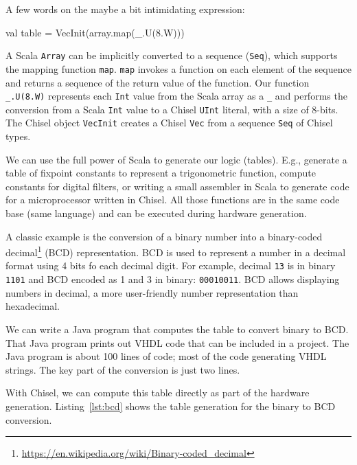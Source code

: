 \documentclass[%
    10pt,
    headinclude, footexclude,
    openright, %
    notitlepage,
    cleardoubleempty,
    headsepline,
    pointlessnumbers,
    bibtotoc, idxtotoc,
    ]{scrbook}
\newcommand{\code}[1]{{\small{\texttt{#1}}}}
\newcommand{\myref}[2]{\href{#1}{#2}}
\renewcommand{\myref}[2]{{#2}{\footnote{\url{#1}}}}
\begin{document}
A few words on the maybe a bit intimidating expression:
\begin{chisel}
  val table = VecInit(array.map(_.U(8.W)))
\end{chisel}

\noindent A Scala \code{Array} can be implicitly converted to a sequence (\code{Seq}),
which supports the mapping function \code{map}.
\code{map} invokes a function on each element of the sequence and returns
a sequence of the return value of the function. Our function \code{\_.U(8.W)} represents
each \code{Int} value from the Scala array as a \code{\_} and performs the conversion
from a Scala \code{Int} value to a Chisel \code{UInt} literal, with a size of 8-bits.
The Chisel object \code{VecInit} creates a Chisel \code{Vec} from a sequence \code{Seq}
of Chisel types.



We can use the full power of Scala to generate our logic (tables).
E.g., generate a table of fixpoint constants to represent a trigonometric function,
compute constants for digital filters, or writing a small assembler in Scala
to generate code for a microprocessor written in Chisel. All those functions
are in the same code base (same language) and can be executed during
hardware generation.

A classic example is the conversion of a binary number
into a \myref{https://en.wikipedia.org/wiki/Binary-coded_decimal}{binary-coded decimal}
(BCD) representation. BCD is used to represent a number in a decimal
format using 4 bits fo each decimal digit. For example, decimal \code{13} is in binary
\code{1101} and BCD encoded as 1 and 3 in binary: \code{00010011}.
BCD allows displaying numbers in decimal, a more user-friendly number
representation than hexadecimal.

We can write a Java program that computes the table to convert binary to BCD.
That Java program prints out VHDL code that can be included in a project.
The Java program is about 100 lines of code; most of the code generating
VHDL strings. The key part of the conversion is just two lines.

With Chisel, we can compute this table directly as part of the hardware generation.
Listing~\ref{lst:bcd} shows the table generation for the binary to BCD conversion.

\end{document}
